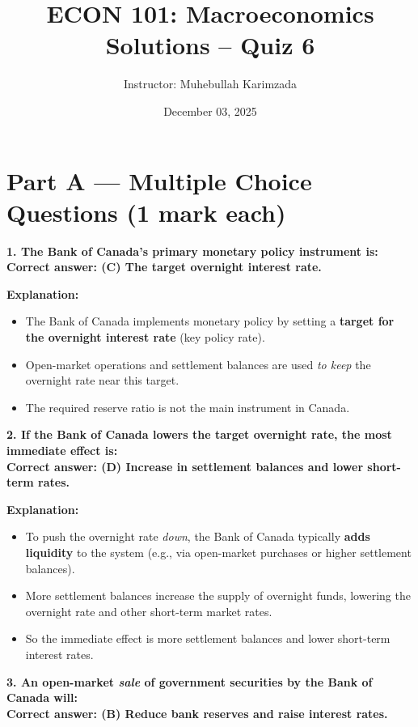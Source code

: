 \documentclass[12pt]{article}
\title{ECON 101: Macroeconomics \vspace{5pt}\\ Solutions -- Quiz 6}
\author{Instructor: Muhebullah Karimzada}
\date{December 03,  2025}
\begin{document}
\maketitle

\section*{Part A --- Multiple Choice Questions (1 mark each)}


\textbf{1. The Bank of Canada's primary monetary policy instrument is:}\\
\textbf{Correct answer: (C) The target overnight interest rate.}

\textbf{Explanation:}
\begin{itemize}
    \item The Bank of Canada implements monetary policy by setting a \textbf{target for the overnight interest rate} (key policy rate).
    \item Open-market operations and settlement balances are used \emph{to keep} the overnight rate near this target.
    \item The required reserve ratio is not the main instrument in Canada.
\end{itemize}

\bigskip

\textbf{2. If the Bank of Canada lowers the target overnight rate, the most immediate effect is:}\\
\textbf{Correct answer: (D) Increase in settlement balances and lower short-term rates.}

\textbf{Explanation:}
\begin{itemize}
    \item To push the overnight rate \emph{down}, the Bank of Canada typically \textbf{adds liquidity} to the system (e.g., via open-market purchases or higher settlement balances).
    \item More settlement balances increase the supply of overnight funds, lowering the overnight rate and other short-term market rates.
    \item So the immediate effect is more settlement balances and lower short-term interest rates.
\end{itemize}

\bigskip

\textbf{3. An open-market \emph{sale} of government securities by the Bank of Canada will:}\\
\textbf{Correct answer: (B) Reduce bank reserves and raise interest rates.}
\end{document}
